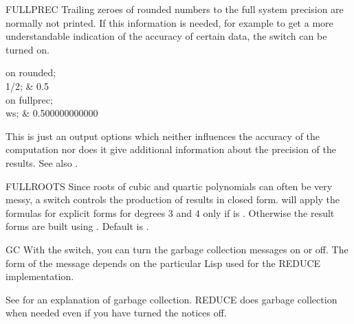 \begin{Switch}[fullprec]{FULLPREC}
Trailing zeroes of rounded numbers to the full system precision are
normally not printed.  If this information is needed, for example to get a
more understandable indication of the accuracy of certain data, the switch
 can be turned on.

\begin{Examples}
on rounded; \\
1/2;  & 0.5 \\
on fullprec; \\
ws; & 0.500000000000
\end{Examples}

\begin{Comments}
This is just an output options which neither influences
the accuracy of the computation nor does it give additional
information about the precision of the results.
See also .
\end{Comments}
\end{Switch}

\begin{Switch}[fullroots]{FULLROOTS}
Since roots of cubic and quartic polynomials can often be very
messy, a switch  controls the production
of results in closed form.  will apply the
formulas for explicit forms for degrees 3 and 4 only if
 is . Otherwise the result forms
are built using . Default is .
\end{Switch}

\begin{Switch}[gc]{GC}
With the  switch, you can turn the garbage collection messages on
or off.  The form of the message depends on the particular Lisp used for
the REDUCE implementation.

\begin{Comments}
See  for an explanation of garbage collection.  REDUCE does
garbage collection when needed even if you have turned the notices off.
\end{Comments}
\end{Switch}



